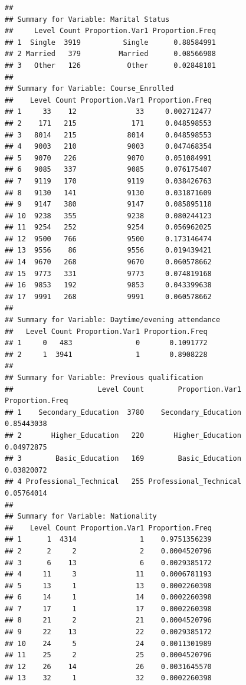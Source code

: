 \documentclass[
]{article}
\begin{document}
\begin{verbatim}
## 
## Summary for Variable: Marital Status 
##     Level Count Proportion.Var1 Proportion.Freq
## 1  Single  3919          Single      0.88584991
## 2 Married   379         Married      0.08566908
## 3   Other   126           Other      0.02848101
## 
## Summary for Variable: Course_Enrolled 
##    Level Count Proportion.Var1 Proportion.Freq
## 1     33    12              33     0.002712477
## 2    171   215             171     0.048598553
## 3   8014   215            8014     0.048598553
## 4   9003   210            9003     0.047468354
## 5   9070   226            9070     0.051084991
## 6   9085   337            9085     0.076175407
## 7   9119   170            9119     0.038426763
## 8   9130   141            9130     0.031871609
## 9   9147   380            9147     0.085895118
## 10  9238   355            9238     0.080244123
## 11  9254   252            9254     0.056962025
## 12  9500   766            9500     0.173146474
## 13  9556    86            9556     0.019439421
## 14  9670   268            9670     0.060578662
## 15  9773   331            9773     0.074819168
## 16  9853   192            9853     0.043399638
## 17  9991   268            9991     0.060578662
## 
## Summary for Variable: Daytime/evening attendance 
##   Level Count Proportion.Var1 Proportion.Freq
## 1     0   483               0       0.1091772
## 2     1  3941               1       0.8908228
## 
## Summary for Variable: Previous qualification 
##                    Level Count        Proportion.Var1 Proportion.Freq
## 1    Secondary_Education  3780    Secondary_Education      0.85443038
## 2       Higher_Education   220       Higher_Education      0.04972875
## 3        Basic_Education   169        Basic_Education      0.03820072
## 4 Professional_Technical   255 Professional_Technical      0.05764014
## 
## Summary for Variable: Nationality 
##    Level Count Proportion.Var1 Proportion.Freq
## 1      1  4314               1    0.9751356239
## 2      2     2               2    0.0004520796
## 3      6    13               6    0.0029385172
## 4     11     3              11    0.0006781193
## 5     13     1              13    0.0002260398
## 6     14     1              14    0.0002260398
## 7     17     1              17    0.0002260398
## 8     21     2              21    0.0004520796
## 9     22    13              22    0.0029385172
## 10    24     5              24    0.0011301989
## 11    25     2              25    0.0004520796
## 12    26    14              26    0.0031645570
## 13    32     1              32    0.0002260398

\end{verbatim}
\end{document}
